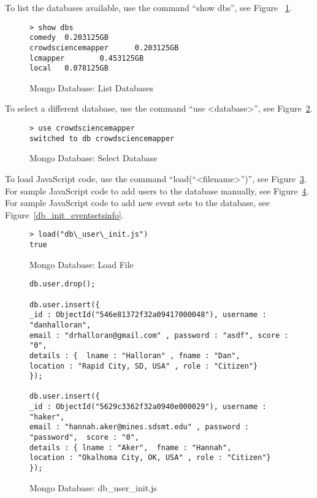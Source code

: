 To list the databases available, use the command ``show dbs'', see Figure ~\ref{show_dbs}.
\begin{figure} [tbh]                     
\caption{Mongo Database: List Databases}
\label{show_dbs}    
\begin{lstlisting}
> show dbs
comedy  0.203125GB
crowdsciencemapper      0.203125GB
lcmapper        0.453125GB
local   0.078125GB
\end{lstlisting}
\end{figure}
To select a different database, use the command ``use <database>'', see Figure~\ref{use_db}.
\begin{figure} [tbh]                     
\caption{Mongo Database: Select Database}
\label{use_db}    
\begin{lstlisting}
> use crowdsciencemapper
switched to db crowdsciencemapper
\end{lstlisting}
\end{figure}
To load JavaScript code, use the command ``load(``<filename>'')'', see Figure~\ref{db_load_file}. For sample JavaScript code to add users to the database manually, see Figure~\ref{db_init_users}.   For sample JavaScript code to add new event sets to the database, see Figure~\ref{db_init_eventsetsinfo}.
\begin{figure} [tbh]                     
\caption{Mongo Database: Load File}
\label{db_load_file}    
\begin{lstlisting}
> load("db\_user\_init.js")
true
\end{lstlisting}
\end{figure}

\begin{figure} [tbh]                     
\caption{Mongo Database: db\_user\_init.js}
\label{db_init_users}    
\begin{lstlisting}
db.user.drop();

db.user.insert({ 
_id : ObjectId("546e81372f32a09417000048"), username : "danhalloran", 
email : "drhalloran@gmail.com" , password : "asdf", score : "0", 
details : {  lname : "Halloran" , fname : "Dan", 
location : "Rapid City, SD, USA" , role : "Citizen"} 
});

db.user.insert({ 
_id : ObjectId("5629c3362f32a0940e000029"), username : "haker", 
email : "hannah.aker@mines.sdsmt.edu" , password : "password",  score : "0", 
details : { lname : "Aker",  fname : "Hannah", 
location : "Okalhoma City, OK, USA" , role : "Citizen"} 
});

\end{lstlisting}
\end{figure}

